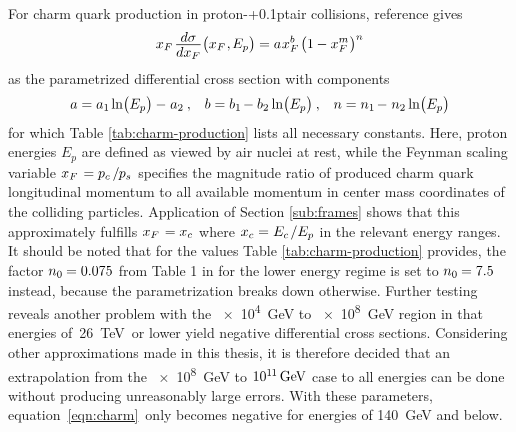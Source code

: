 For charm quark production in proton-{\kern+0.1pt}air collisions, reference \cite{Goncalves_2007} gives
\begin{equation}
	x_F \kern+1.0pt \frac{\raisebox{-0.5ex}{$d\sigma$}}{\raisebox{0.5ex}{$dx_F$}} \bigl( x_F \kern+0.5pt, \kern-0.5pt E_p \bigr)
	\kern-0.1pt = a \kern+0.5pt x_F^b \kern+1.0pt \bigl( 1 \kern-0.3pt - x_F^m \kern+0.3pt \bigr)^n
	\label{eqn:charm}
\end{equation}
as the parametrized differential cross section with components
\begin{align*}
	&& a = a_1 \kern-0.5pt \ln\bigl(E_p\bigr) - \kern+0.5pt a_2 \: , && b = b_1 \kern-1.0pt - b_2 \ln\bigl(E_p\bigr) \: , &&
	n = n_1 \kern-1.0pt - \kern+0.5pt n_2 \ln\bigl(E_p\bigr) &&
\end{align*}
for which Table \ref{tab:charm-production} lists all necessary constants. Here, proton energies $E_p$ are defined as viewed
by air nuclei at rest, while the Feynman scaling variable $x_F \kern+1.0pt = p_c \kern+1.5pt / \kern-0.5pt p_s$ specifies
the magnitude ratio of produced charm quark longitudinal momentum to all available momentum in center mass coordinates of the
colliding particles. Application of Section \ref{sub:frames} shows that this approximately fulfills $x_F \kern+1.0pt = x_c$
where $\cramped{x_c = \kern+0.2pt E_c \kern+1.0pt / E_p}$ in the relevant energy ranges. It should be noted that for the values
Table \ref{tab:charm-production} provides, the factor $n_0 \kern-0.5pt = \num{0.075}$ from Table 1 in \cite{Goncalves_2007} 
for the lower energy regime is set to $n_0 \kern-0.5pt = \num{7.5}$ instead, because the parametrization breaks down otherwise.
Further testing reveals another problem with the \qty{e4}{\giga\electronvolt} to \qty{e8}{\giga\electronvolt} region
in that energies of~\qty{26}{\tera\electronvolt}~or lower yield negative differential cross
sections. Considering other approximations made in this thesis, it is therefore decided that an extrapolation from the
\qty{e8}{\giga\electronvolt} to $10^{1 \kern-0.3pt 1} \kern+1.5pt \unit{\giga\electronvolt}$ case to all energies
can be done without producing unreasonably large errors. With these parameters, equation~\eqref{eqn:charm}~only becomes
negative for energies of \qty{140}{\giga\electronvolt} and below.



